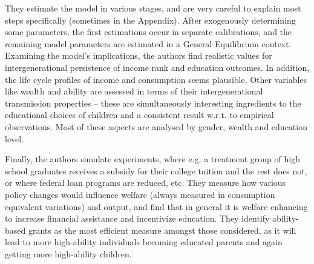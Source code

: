 \documentclass[12pt,a4paper]{article}
\begin{document}
They estimate the model in various stages, and are very careful to explain most steps specifically (sometimes in the Appendix). After exogenously determining some parameters, the first estimations occur in separate calibrations, and the remaining model parameters are estimated in a General Equilibrium context. 
 Examining the model’s implications, the authors find realistic values for intergenerational persistence of income rank and education outcomes. In addition, the life cycle profiles of income and consumption seems plausible. Other variables like wealth and ability are assessed in terms of their intergenerational transmission properties – these are simultaneously interesting ingredients to the educational choices of children and a consistent result w.r.t. to empirical observations. Most of these aspects are analysed by gender, wealth and education level. 
 
Finally, the authors simulate experiments, where e.g. a treatment group of high school graduates receives a subsidy for their college tuition and the rest does not, or where federal loan programs are reduced, etc. They measure how various policy changes would influence welfare (always measured in consumption equivalent variations) and output, and find that in general it is welfare enhancing to increase financial assistance and incentivize education. They identify ability-based grants as the most efficient measure amongst those considered, as it will lead to more high-ability individuals becoming educated parents and again getting more high-ability children. 

\pagebreak



\pagebreak
\end{document}
